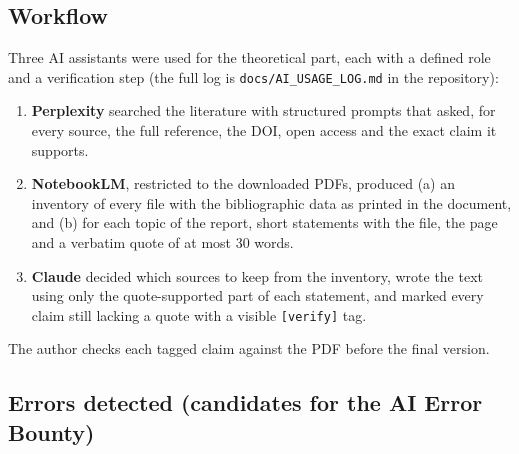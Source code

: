 
\subsection*{Workflow}

Three AI assistants were used for the theoretical part, each with a defined role and a verification
step (the full log is \texttt{docs/AI\_USAGE\_LOG.md} in the repository):
\begin{enumerate}
  \item \textbf{Perplexity} searched the literature with structured prompts that asked, for every
        source, the full reference, the DOI, open access and the exact claim it supports.
  \item \textbf{NotebookLM}, restricted to the downloaded PDFs, produced (a) an inventory of every file
        with the bibliographic data as printed in the document, and (b) for each topic of the report,
        short statements with the file, the page and a verbatim quote of at most 30 words.
  \item \textbf{Claude} decided which sources to keep from the inventory, wrote the text using only the
        quote-supported part of each statement, and marked every claim still lacking a quote with a
        visible \texttt{[verify]} tag.
\end{enumerate}
The author checks each tagged claim against the PDF before the final version.

\subsection*{Errors detected (candidates for the AI Error Bounty)}

